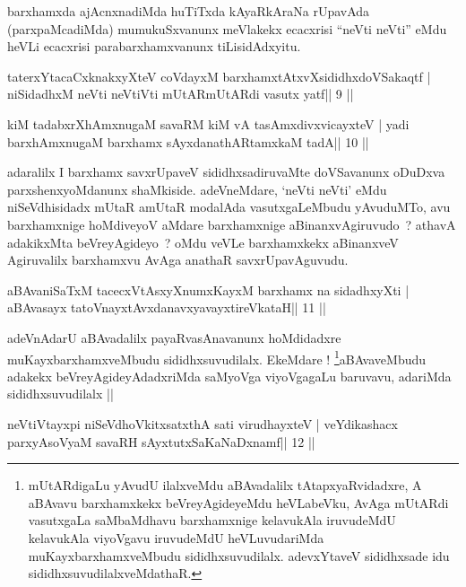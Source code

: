 \begin{artha}
barxhamxda ajAcnxnadiMda huTiTxda kAyaRkAraNa rUpavAda (parxpaMcadiMda) mumukuSxvanunx meVlakekx ecacxrisi ``neVti neVti'' eMdu heVLi ecacxrisi parabarxhamxvanunx tiLisidAdxyitu.
\end{artha}


\begin{shl}
taterxYtacaCxknakxyXteV coVdayxM barxhamxtAtxvXsididhxdoVSakaqtf |
niSidadhxM neVti neVtiVti mUtARmUtARdi vasutx yatf\hfill || 9 ||
\end{shl}

\begin{shl}
kiM tadabxrXhAmxnugaM savaRM kiM vA tasAmxdivxvicayxteV |
yadi barxhAmxnugaM barxhamx sAyxdanathARtamxkaM tadA\hfill || 10 ||
\end{shl}

\begin{artha}
adaralilx I barxhamx savxrUpaveV sididhxsadiruvaMte doVSavanunx
oDuDxva parxshenxyoMdanunx shaMkiside. adeVneMdare, `neVti neVti' eMdu
niSeVdhisidadx mUtaR amUtaR modalAda vasutxgaLeMbudu yAvuduMTo, avu
barxhamxnige hoMdiveyoV aMdare barxhamxnige aBinanxvAgiruvudo~?
athavA adakikxMta beVreyAgideyo~? oMdu veVLe barxhamxkekx  aBinanxveV
Agiruvalilx barxhamxvu AvAga anathaR savxrUpavAguvudu. 
\end{artha}

\begin{shl}
aBAvaniSaTxM tacecxVtAsxyXnumxKayxM barxhamx na sidadhxyXti |
aBAvasayx tatoV\s nayxtAvxdanavxyavayxtireVkataH\hfill || 11 ||
\end{shl}

\begin{artha}
adeVnAdarU aBAvadalilx payaRvasAnavanunx hoMdidadxre
muKayxbarxhamxveMbudu sididhxsuvudilalx. EkeMdare
! \footnote[1]{mUtARdigaLu yAvudU ilalxveMdu aBAvadalilx
  tAtapxyaRvidadxre, A aBAvavu barxhamxkekx beVreyAgideyeMdu
  heVLabeVku, AvAga mUtARdi vasutxgaLa saMbaMdhavu barxhamxnige
  kelavukAla iruvudeMdU kelavukAla viyoVgavu iruvudeMdU heVLuvudariMda
  muKayxbarxhamxveMbudu sididhxsuvudilalx. adevxYtaveV sididhxsade idu
  sididhxsuvudilalxveMdathaR.}aBAvaveMbudu adakekx beVreyAgideyAdadxriMda saMyoVga
viyoVgagaLu baruvavu, adariMda sididhxsuvudilalx ||
\end{artha}

\begin{shl}
neVtiVtayxpi niSeVdhoVkitxsatxthA sati virudhayxteV |
veYdikashacx parxyAsoV\s yaM savaRH sAyxtutxSaKaNaDxnamf\hfill || 12 ||
\end{shl}

